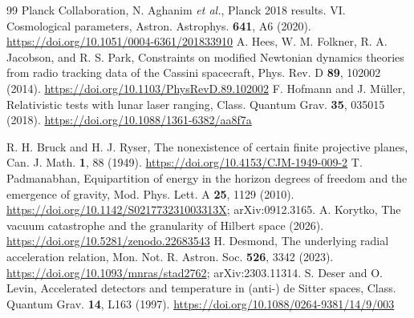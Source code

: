 \documentclass[aps,prd,twocolumn,superscriptaddress,nofootinbib,showkeys]{revtex4-2}
\begin{document}
\begin{thebibliography}{99}
 Planck Collaboration, N. Aghanim \emph{et al.}, Planck 2018 results. VI. Cosmological parameters, Astron. Astrophys. \textbf{641}, A6 (2020). \url{https://doi.org/10.1051/0004-6361/201833910}
 A. Hees, W. M. Folkner, R. A. Jacobson, and R. S. Park, Constraints on modified Newtonian dynamics theories from radio tracking data of the Cassini spacecraft, Phys. Rev. D \textbf{89}, 102002 (2014). \url{https://doi.org/10.1103/PhysRevD.89.102002}
 F. Hofmann and J. M\"uller, Relativistic tests with lunar laser ranging, Class. Quantum Grav. \textbf{35}, 035015 (2018). \url{https://doi.org/10.1088/1361-6382/aa8f7a}

 R. H. Bruck and H. J. Ryser, The nonexistence of certain finite projective planes, Can. J. Math. \textbf{1}, 88 (1949). \url{https://doi.org/10.4153/CJM-1949-009-2}
 T. Padmanabhan, Equipartition of energy in the horizon degrees of freedom and the emergence of gravity, Mod. Phys. Lett. A \textbf{25}, 1129 (2010). \url{https://doi.org/10.1142/S021773231003313X}; arXiv:0912.3165.
 A. Korytko, The vacuum catastrophe and the granularity of Hilbert space (2026). \url{https://doi.org/10.5281/zenodo.22683543}
 H. Desmond, The underlying radial acceleration relation, Mon. Not. R. Astron. Soc. \textbf{526}, 3342 (2023). \url{https://doi.org/10.1093/mnras/stad2762}; arXiv:2303.11314.
 S. Deser and O. Levin, Accelerated detectors and temperature in (anti-) de Sitter spaces, Class. Quantum Grav. \textbf{14}, L163 (1997). \url{https://doi.org/10.1088/0264-9381/14/9/003}
\end{thebibliography}
\end{document}
